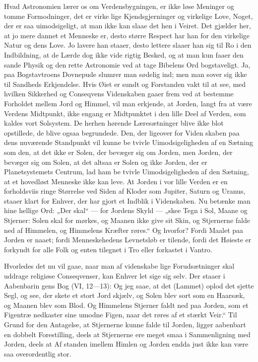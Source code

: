 \documentclass[12pt]{book}
\newcommand{\opage}[1]{\marginnote{\footnotesize\textit{[#1]}}}
\begin{document}
Hvad Astronomien lærer os om Verdensbygningen, er
ikke løse Meninger og tomme Formodninger, det er virke\-%
lige Kjendsgjerninger og virkelige Love, Noget, der er saa
uimodsigeligt, at man ikke kan slaae det hen i Veiret.
Det gjælder her, at jo mere dannet et Menneske er, desto
større Respect har han for den virkelige Natur og dens
Love. Jo lavere han staaer, desto lettere slaaer han sig
til Ro i den Indbildning, at de Lærde dog ikke vide rigtig
Besked, og at man kun faaer den sande Physik og den
rette Astronomie ved at tage Bibelens Ord bogstaveligt.
Ja, paa Bogstavtroens Dovnepude slumrer man sødelig ind;
men man sover sig ikke til Sandheds Erkjendelse. Hvis
Øiet er sundt og Forstanden vakt til at see, med hvilken
Sikkerhed og Conseqvens Videnskaben gaaer frem ved
\opage{66}\setcounter{footnote}{0}%
at bestemme Forholdet mellem Jord og Himmel, vil
man erkjende, at Jorden, langt fra at være Verdens
Midtpunkt, ikke engang er Midtpunktet i den lille Deel
af Verden, som kaldes vort Solsystem. De herhen
hørende Læresætninger blive ikke blot opstillede, de
blive ogsaa begrundede. Den, der ligeover for Viden\-%
skaben paa dens nuværende Standpunkt vil kunne be\-%
tvivle Uimodsigeligheden af en Sætning som den, at det
ikke er Solen, der bevæger sig om Jorden, men Jorden,
der bevæger sig om Solen, at det altsaa er Solen og ikke
Jorden, der er Planetsystemets Centrum, lad ham be\-%
tvivle Uimodsigeligheden af den Sætning, at et hovedløst
Menneske ikke kan leve. At Jorden i vor lille Verden
er en forholdsviis ringe Størrelse ved Siden af Kloder
som Jupiter, Saturn og Uranus, staaer klart for Enhver,
der har gjort et Indblik i Videnskaben. Nu betænke
man hine hellige Ord: „Der skal“ --- for Jordens Skyld ---
„skee Tegn i Sol, Maane og Stjerner: Solen skal for\-%
mørkes, og Maanen ikke give sit Skin, og Stjernerne
falde ned af Himmelen, og Himmelens Kræfter røres.“
Og hvorfor? Fordi Maalet paa Jorden er naaet; fordi
Menneskehedens Levnetsløb er tilende, fordi det Høieste
er forkyndt for alle Folk og enten tilegnet i Tro eller
forkastet i Vantro.

Hvorledes det nu vil gaae, naar man af videnskabe\-%
lige Forudsætninger skal uddrage religiøse Conseqvenser,
kan Enhver let sige sig selv. Der staaer i Aabenbarin\-%
gens Bog (VI, 12---13): Og jeg saae, at det (Lammet)
oplod det sjette Segl, og see, der skete et stort Jord\-%
skjælv, og Solen blev sort som en Haarsæk, og Maanen
blev som Blod. Og Himmelens Stjerner faldt ned paa
Jorden, som et Figentræ nedkaster sine umodne Figen,
naar det røres af et stærkt Veir.“ Til Grund for den
Antagelse, at Stjernerne kunne falde til Jorden, ligger
\opage{67}\setcounter{footnote}{0}%
aabenbart en dobbelt Forestilling, deels at Stjernerne ere
meget smaa i Sammenligning med Jorden, deels at Af\-%
standen imellem Himlen og Jorden endda just ikke kan
være saa overordentlig stor.
\end{document}
